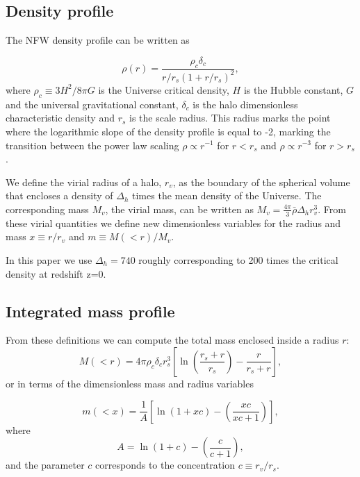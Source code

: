\documentclass[a4,useAMS,usenatbib,usegraphicx]{mn2e}
\begin{document}
\subsection{Density profile}

The NFW density profile can be written as

\begin{equation}
\rho(r) = \frac{\rho_c\delta_c}{r/r_s(1+r/r_s)^2},
\label{eq:definition}
\end{equation}
%
where $\rho_c\equiv 3H^2/8\pi G$ is the Universe critical density, $H$
is the Hubble constant, $G$ and the universal gravitational constant,
$\delta_c$ is the halo dimensionless characteristic density and $r_s$
is the scale radius. 
This radius marks the point where the logarithmic slope of the density
profile is equal to -2, marking the transition between the power law
scaling $\rho\propto r^{-1}$ for $r<r_s$ and $\rho\propto r^{-3}$ for
$r>r_s$. 

We define the virial radius of a halo, $r_v$, as the boundary of the
spherical volume that encloses a density of $\Delta_h$ times the mean
density of the Universe.  
The corresponding mass $M_{v}$, the virial mass, can be written as
$M_{v} = \frac{4\pi}{3}\bar{\rho}\Delta_h r_v^3$.  
From these virial quantities we define new dimensionless variables for
the radius and mass $x\equiv r/r_v$ and $m\equiv M(<r)/M_v$. 

In this paper we use $\Delta_h=740$ roughly corresponding to 200 times
the critical density at redshift z=0.


\subsection{Integrated mass profile}

From these definitions we can compute the total mass enclosed inside a
radius $r$:
\begin{equation}
M(<r) = 4\pi\rho_c\delta_c  r_s^3\left[\ln \left
  (\frac{r_s+r}{r_s}\right) - \frac{r}{r_s+r}\right],
\end{equation}
%
or in terms of the dimensionless mass and radius variables

\begin{equation}
m(<x) =
\frac{1}{A}\left[\ln\left(1+xc\right)-\left(\frac{xc}{xc+1}\right)\right],
\label{eq:profile}
\end{equation}
%
where
%
\begin{equation}
A=\ln\left(1+c\right)-\left(\frac{c}{c+1}\right),
\end{equation}
%
and the parameter $c$ corresponds to the concentration $c\equiv r_v/r_s$.
\end{document}
